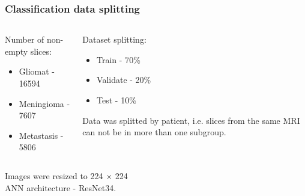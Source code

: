 \documentclass{beamer}
\begin{document}
\begin{frame}
\frametitle{Classification data splitting}
\begin{columns}
	\begin{column}{0.5\textwidth}
		Number of non-empty slices:
		\begin{itemize}
			\item Gliomat - 16594
			\item Meningioma - 7607
			\item Metastasis - 5806
		\end{itemize}
	\end{column}
	\begin{column}{0.5\textwidth}
		Dataset splitting:
		\begin{itemize}
			\item Train - 70\%
			\item Validate - 20\%
			\item Test - 10\%
		\end{itemize}
		Data was splitted by patient, i.e. slices from the same MRI can not be in more than one subgroup. 
	\end{column}
\end{columns}
\vspace{1cm}
\centering
Images were resized to 224 $\times$ 224\\
ANN architecture - ResNet34.
\end{frame}
\end{document}
